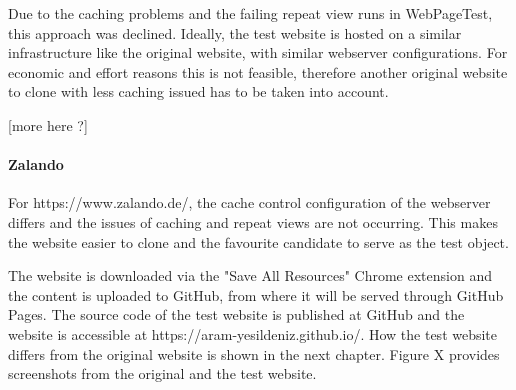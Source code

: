 Due to the caching problems and the failing repeat view runs in WebPageTest, this approach was declined.
Ideally, the test website is hosted on a similar infrastructure like the original website, with similar webserver configurations.
For economic and effort reasons this is not feasible, therefore another original website to clone with less caching issued has to be taken into account.

[more here ?]










\paragraph{Zalando}


For https://www.zalando.de/, the cache control configuration of the webserver differs and the issues of caching and repeat views are not occurring.
This makes the website easier to clone and the favourite candidate to serve as the test object.


The website is downloaded via the "Save All Resources" Chrome extension and the content is uploaded to GitHub, from where it will be served through GitHub Pages.
The source code of the test website is published at GitHub and the website is accessible at https://aram-yesildeniz.github.io/.
How the test website differs from the original website is shown in the next chapter.
Figure X provides screenshots from the original and the test website.

